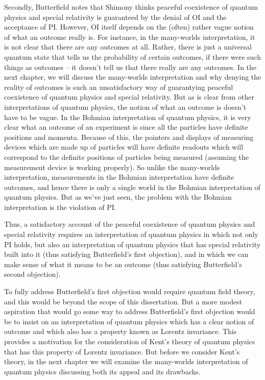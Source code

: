 Secondly,  Butterfield notes that Shimony thinks peaceful coexistence of quantum physics and special relativity is guaranteed by the denial of OI and the acceptance of PI. However, OI itself depends on the (often) rather vague notion of what an outcome really is. For instance, in the many-worlds interpretation, it is not clear that there are any outcomes at all. Rather, there is just a universal quantum state that tells us the probability of certain outcomes, if there were such things as outcomes -- it doesn't tell us that there really are any outcomes. In the next chapter, we will discuss the many-worlds interpretation and why denying the reality of outcomes is such an unsatisfactory way of guarantying peaceful coexistence of quantum physics and special relativity. But as is clear from other interpretations of quantum physics, the notion of what an outcome is doesn't have to be vague. In the Bohmian interpretation of quantum physics, it is very clear what an outcome of an experiment is since all the particles have definite positions and momenta. Because of this, the pointers and displays of measuring devices which are made up of particles will have definite readouts which will correspond to the definite positions of particles being measured (assuming the measurement device is working properly). So unlike the many-worlds interpretation, measurements in the Bohmian interpretation have definite outcomes, and hence there is only a single world in the Bohmian interpretation of quantum physics. But as we've just seen, the problem with the Bohmian interpretation is the violation of PI.

Thus, a satisfactory account of the peaceful coexistence of quantum physics and special relativity requires an interpretation of quantum physics in which not only PI holds, but also an interpretation of quantum physics that has special relativity built into it (thus satisfying Butterfield's first objection), and in which we can make sense of what it means to be an outcome (thus satisfying Butterfield's second objection). 

To fully address Butterfield's first objection would require quantum field theory, and this would be beyond the scope of this dissertation. But a more modest aspiration that would go some way to address Butterfield's first objection would be to insist on an interpretation of quantum physics which has a clear notion of outcome and which also has a property known as Lorentz invariance. This provides a motivation for the consideration of Kent's theory of quantum physics that has this property of Lorentz invariance. But before we consider Kent's theory, in the next chapter we will examine the many-worlds interpretation of quantum physics discussing both its appeal and its drawbacks.
